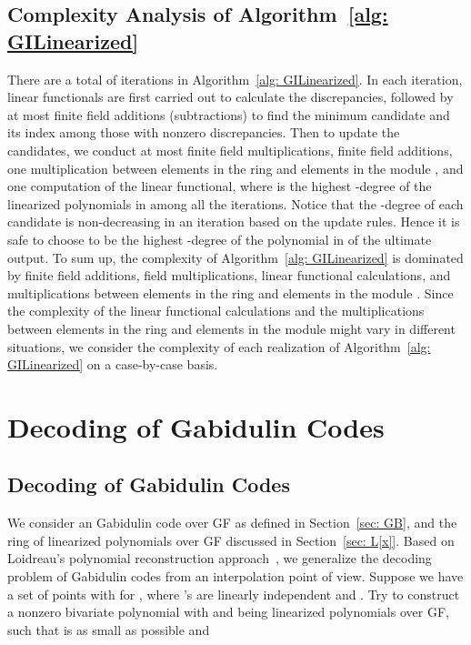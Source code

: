 \documentclass[11pt,onecolumn,draftcls]{IEEEtran}
\begin{document}
\subsection{Complexity Analysis of Algorithm~\ref{alg: GILinearized}} \label{section: ComplexityGeneral}
There are a total of  iterations in Algorithm~\ref{alg: GILinearized}. In each iteration,  linear functionals are first carried out to calculate the discrepancies, followed by at most  finite field additions (subtractions) to find the minimum candidate and its index among those with nonzero discrepancies. Then to update the candidates, we conduct at most  finite field multiplications,  finite field additions, one multiplication between elements in the ring  and elements in the module , and one computation of the linear functional, where  is the highest -degree of the linearized polynomials in  among all the iterations. Notice that the -degree of each candidate is non-decreasing in an iteration based on the update rules. Hence it is safe to choose  to be the highest -degree of the polynomial in  of the ultimate output. To sum up, the complexity of Algorithm~\ref{alg: GILinearized} is dominated by  finite field additions,  field multiplications,  linear functional calculations, and  multiplications between elements in the ring  and elements in the module . Since the complexity of the  linear functional calculations and the multiplications between elements in the ring and elements in the module might vary in different situations, we consider the complexity of each realization of Algorithm~\ref{alg: GILinearized} on a case-by-case basis.

\section{Decoding of Gabidulin Codes}
\label{sec: GeneralGb}
\subsection{Decoding of Gabidulin Codes}
We consider an  Gabidulin code over GF as defined in Section~\ref{sec: GB}, and the ring of linearized polynomials  over GF discussed in Section~\ref{sec: L[x]}. Based on Loidreau's polynomial reconstruction approach~\cite{loidreau_wcc05}, we generalize the decoding problem of Gabidulin codes from an interpolation point of view. Suppose we have a set of points  with  for , where 's are linearly independent and . Try to construct a nonzero bivariate polynomial  with  and  being linearized polynomials over GF, such that  is as small as possible and
\end{document}
